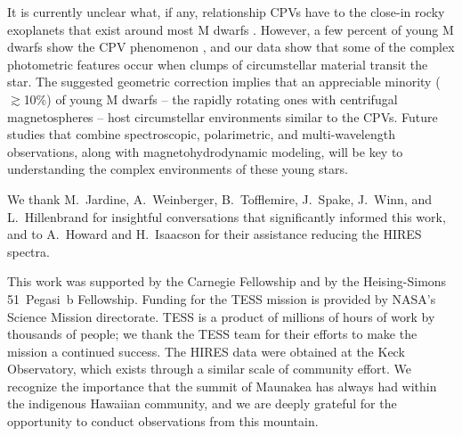 \documentclass[11pt,twocolumn,tighten,linenumbers]{aastex7}
\begin{document}
It is currently unclear what, if any, relationship CPVs have to the
close-in rocky exoplanets that exist around most M dwarfs
\citep{Dressing2015}.  However, a few percent of young M dwarfs show
the CPV phenomenon \citep{Rebull2020}, and our data show that some of
the complex photometric features occur when clumps of circumstellar
material transit the star.  The suggested geometric correction implies
that an appreciable minority ($\gtrsim$10\%) of young M dwarfs -- the
rapidly rotating ones with centrifugal magnetospheres -- host
circumstellar environments similar to the CPVs.  Future studies that
combine spectroscopic, polarimetric, and multi-wavelength
observations, along with magnetohydrodynamic modeling, will be key to
understanding the complex environments of these young
stars.

\begin{acknowledgements}
  We thank M.~Jardine, A.~Weinberger, B.~Tofflemire,
  J.~Spake, J.~Winn, and L.~Hillenbrand for insightful conversations
  that significantly informed this work, and to A.~Howard and
  H.~Isaacson for their assistance reducing the HIRES spectra.

  This work was supported by the Carnegie Fellowship and by the
  Heising-Simons 51~Pegasi~b Fellowship.
  Funding for the TESS mission is provided by NASA’s Science Mission
  directorate.
  TESS is a product of millions of hours of work by thousands of people;
  we thank the TESS team for their efforts to make the mission a
  continued success.
  The HIRES data were obtained at the Keck Observatory, which exists
  through a similar scale of community effort.
  We recognize the importance that the summit of Maunakea has always had
  within the indigenous Hawaiian community, and we are deeply grateful 
  for the opportunity to conduct observations from this mountain.
\end{acknowledgements}






\end{document}
